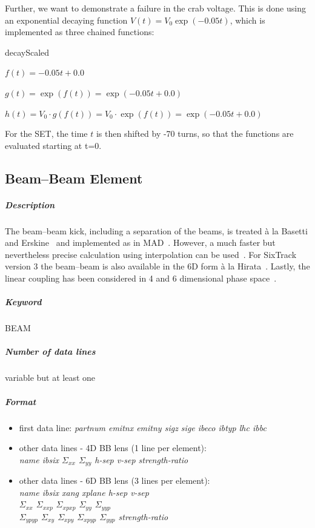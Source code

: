 \documentclass[a4paper,11pt]{report}
\newenvironment{description_alligned}[1]
{\begin{list}{}%
    {\renewcommand\makelabel[1]{##1:\hfill}%
      \settowidth\labelwidth{\makelabel{#1}}%
      \setlength\leftmargin{\labelwidth}
      \addtolength\leftmargin{\labelsep}}}
  {\end{list}}
\begin{document}
Further, we want to demonstrate a failure in the crab voltage.
This is done using an exponential decaying function $V(t) = V_0 \exp\left(-0.05 t\right)$, which is implemented as three chained functions:
\begin{description_alligned}{decayScaled}
\item[expCore] $f(t) = -0.05 t + 0.0$
\item[decay] $g(t) = \exp(f(t)) = \exp(-0.05 t + 0.0)$
\item[decayScaled] $h(t) = V_0 \cdot g(f(t)) = V_0 \cdot \exp(f(t)) = \exp(-0.05 t + 0.0)$
\end{description_alligned}
For the SET, the time $t$ is then shifted by -70 turns, so that the functions are evaluated starting at t=0.

\subsection{Beam--Beam Element} \label{BeamBeam}

\subparagraph{Description} The beam--beam kick, including a separation
of the beams, is treated \`{a} la Basetti and Erskine~\cite{BasErs}
and implemented as in MAD~\cite{MAD}. However, a much faster but
nevertheless precise calculation using interpolation can be
used~\cite{ERIC}. For SixTrack version 3 the beam--beam is also
available in the 6D form \`{a} la Hirata~\cite{Hirata}. Lastly, the
linear coupling has been considered in 4 and 6 dimensional phase
space~\cite{ripbeam}. 

\subparagraph{Keyword} BEAM 
\subparagraph{Number of data lines} variable but at least one

\subparagraph{Format} 
\begin{itemize}
\item first data line: {\em partnum emitnx emitny sigz sige ibeco
    ibtyp lhc ibbc} 
\item other data lines - 4D BB lens (1 line per element): \\
{\em name ibsix $\Sigma_{xx}$ $\Sigma_{yy}$ h-sep v-sep strength-ratio}
\item other data lines - 6D BB lens (3 lines per element): \\
{\em name ibsix xang xplane h-sep v-sep} \\
{\em $\Sigma_{xx}$ $\Sigma_{xxp}$ $\Sigma_{xpxp}$ $\Sigma_{yy}$ $\Sigma_{yyp}$} \\
{\em $\Sigma_{ypyp}$ $\Sigma_{xy}$ $\Sigma_{xpy}$ $\Sigma_{xpyp}$ $\Sigma_{yyp}$ strength-ratio} \\
\end{itemize}
\end{document}
